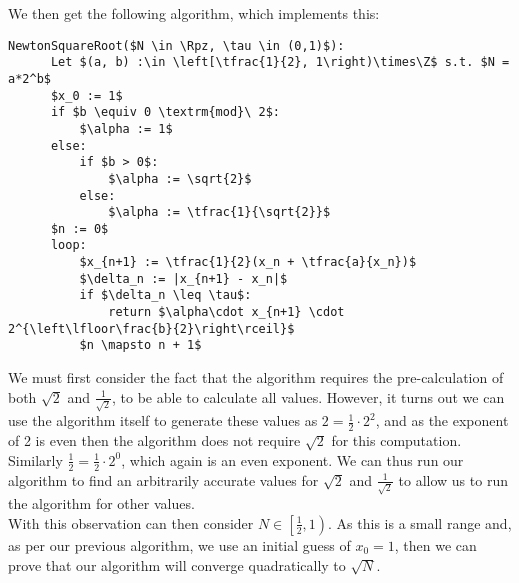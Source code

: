 We then get the following algorithm, which implements this:

\begin{lstlisting}[frame=single,mathescape,caption={Newton Method for Square Root v3},label={PCD_"Newton Method for Square Root v3"}]
  NewtonSquareRoot($N \in \Rpz, \tau \in (0,1)$):
      Let $(a, b) :\in \left[\tfrac{1}{2}, 1\right)\times\Z$ s.t. $N = a*2^b$
      $x_0 := 1$
      if $b \equiv 0 \textrm{mod}\ 2$:
          $\alpha := 1$
      else:
          if $b > 0$:
              $\alpha := \sqrt{2}$
          else:
              $\alpha := \tfrac{1}{\sqrt{2}}$
      $n := 0$
      loop:
          $x_{n+1} := \tfrac{1}{2}(x_n + \tfrac{a}{x_n})$
          $\delta_n := |x_{n+1} - x_n|$
          if $\delta_n \leq \tau$:
              return $\alpha\cdot x_{n+1} \cdot 2^{\left\lfloor\frac{b}{2}\right\rceil}$
          $n \mapsto n + 1$
\end{lstlisting}

We must first consider the fact that the algorithm requires the pre-calculation of both \(\sqrt{2}\) and \(\tfrac{1}{\sqrt{2}}\), to be able to calculate all values. However, it turns out we can use the algorithm itself to generate these values as \(2 = \tfrac{1}{2} \cdot 2^2\), and as the exponent of 2 is even then the algorithm does not require \(\sqrt{2}\) for this computation. Similarly \(\tfrac{1}{2} = \tfrac{1}{2} \cdot 2^0\), which again is an even exponent. We can thus run our algorithm to find an arbitrarily accurate values for \(\sqrt{2}\) and \(\tfrac{1}{\sqrt{2}}\) to allow us to run the algorithm for other values.\\

With this observation can then consider \(N \in \left[\tfrac{1}{2}, 1\right)\). As this is a small range and, as per our previous algorithm, we use an initial guess of \(x_0 = 1\), then we can prove that our algorithm will converge quadratically to \(\sqrt{N}\).

